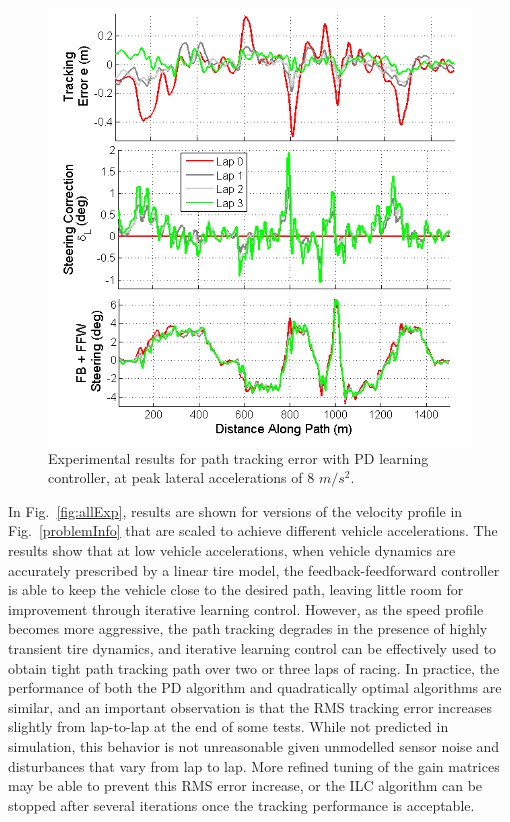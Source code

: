 \documentclass[letterpaper, 10 pt, conference]{ieeeconf}  %
\begin{document}
\begin{figure}[h]
\centering
\includegraphics[width=3.5 in]{figures/PDexp.png}
\caption{Experimental results for path tracking error with PD learning controller, at peak lateral accelerations of 8 $m/s^2$.}
\label{fig:PDexp}
\end{figure}

In Fig.~\ref{fig:allExp}, results are shown for versions of the velocity profile in Fig.~\ref{problemInfo} that are scaled to achieve different vehicle accelerations. The results
show that at low vehicle accelerations, when vehicle dynamics are accurately prescribed by a linear tire model, the feedback-feedforward controller is able to keep the vehicle close to the
desired path, leaving little room for improvement through iterative learning control. However, as the speed profile becomes more aggressive, the path tracking degrades in the presence
of highly transient tire dynamics, and iterative learning control can be effectively used to obtain tight path tracking path over two or three laps of racing. 
In practice, the performance of both the PD algorithm and quadratically optimal algorithms are similar, and an important observation is that the RMS tracking error increases slightly from
lap-to-lap at the end of some tests. While not predicted in simulation, this behavior is not unreasonable given unmodelled sensor noise and disturbances that vary from lap to lap. 
More refined tuning of the gain matrices may be able to prevent this RMS error increase, or the ILC algorithm can be stopped after several iterations once the tracking performance is acceptable.
\end{document}
